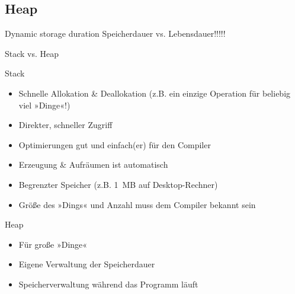 \subsection{Heap}

\begin{frame}{Dynamic storage duration}
Speicherdauer vs. Lebensdauer!!!!!
\end{frame}


\begin{frame}[fragile]{Stack vs. Heap}
	\begin{block}{Stack}
		\begin{itemize}
			\item Schnelle Allokation \& Deallokation {\tiny(z.B. ein einzige Operation für beliebig viel »Dinge«!)}
			\item Direkter, schneller Zugriff
			\item Optimierungen gut und einfach(er) für den Compiler
			\item Erzeugung \& Aufräumen ist automatisch
			\item Begrenzter Speicher (z.B. 1~MB auf Desktop-Rechner)
			\item Größe des »Dings« und Anzahl muss dem Compiler bekannt sein
		\end{itemize}
	\end{block}
	
	\begin{block}{Heap}
		\begin{itemize}
			\item Für große »Dinge«
			\item Eigene Verwaltung der Speicherdauer
			\item Speicherverwaltung während das Programm läuft
		\end{itemize}
	\end{block}
\end{frame}

